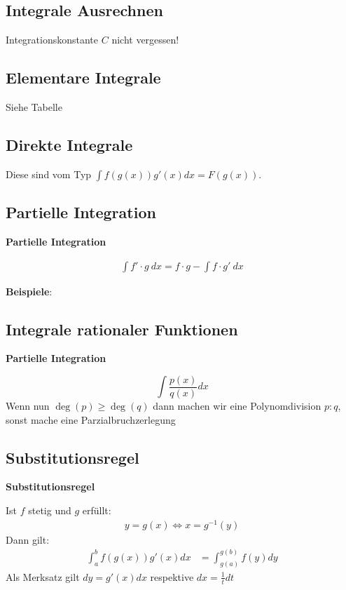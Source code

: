 \documentclass[25pt]{sciposter}
\newenvironment{method}[1]{\begin{mdframed}[backgroundcolor=blue!10,innertopmargin=15pt, innerbottommargin=15pt, nobreak=true]
		\textbf{#1 }
	}
	{ 
	\end{mdframed}
}
\newenvironment{important}{\begin{mdframed}[backgroundcolor=red!50,innertopmargin=15pt, innerbottommargin=15pt, nobreak=true]
		\Large
	}
	{ 
	\end{mdframed}
}
\begin{document}
\begin{multicols}{3}
\section*{Integrale Ausrechnen}

\begin{important}
Integrationskonstante $C$ nicht vergessen!
\end{important}

\subsection*{Elementare Integrale}
Siehe Tabelle

\subsection*{Direkte Integrale}
Diese sind vom Typ $\int f(g(x)) g'(x) dx = F(g(x))$.

\subsection*{Partielle Integration}
\begin{method}{Partielle Integration}
\begin{align*}
	\int f' \cdot g \ dx = f \cdot g - \int f \cdot g' \  dx
\end{align*}
\end{method}
\textbf{Beispiele}:


\subsection*{Integrale rationaler Funktionen}
\begin{method}{Partielle Integration}
	$$\int \frac{p(x)}{q(x)} dx$$
	Wenn nun $\deg(p) \geq \deg(q)$ dann machen wir eine Polynomdivision $p:q$, sonst mache eine Parzialbruchzerlegung
\end{method}

\subsection*{Substitutionsregel}
\begin{method}{Substitutionsregel}
Ist $f$ stetig und $g$ erfüllt:
\begin{align*}
	y = g(x) \iff x = g^{-1}(y)
\end{align*}
Dann gilt:
\begin{align*}
\int_a ^b f(g(x))g'(x) dx &= \int_{g(a)}^{g(b)} f(y) dy
\end{align*}
Als Merksatz gilt $dy = g'(x) dx$ respektive $dx = \frac{1}{t} dt$
\end{method}


\end{multicols}
\end{document}
